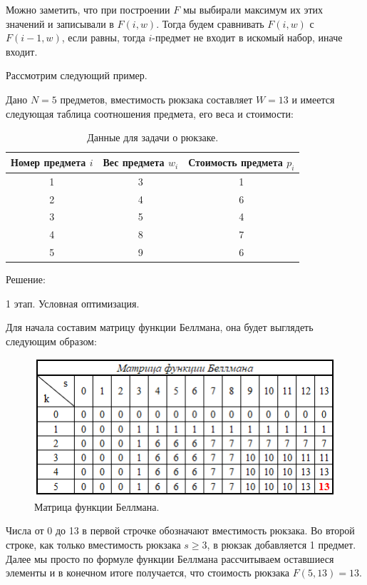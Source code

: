Можно заметить, что при построении $F$ мы выбирали максимум их этих значений и записывали в $F(i,w)$. Тогда будем сравнивать $F(i,w)$ с $F(i-1,w)$, если равны, тогда $i$-предмет не входит в искомый набор, иначе входит.

Рассмотрим следующий пример. 

Дано $N=5$ предметов, вместимость рюкзака составляет $W=13$ и имеется следующая таблица соотношения предмета, его веса и стоимости:

\begin{table}[h]
    \centering
    \begin{tabular}{|c|c|c|}
            \hline
            Номер предмета $i$ & Вес предмета $w_i$ & Стоимость предмета $p_i$\\
            \hline
            1 & 3 & 1\\
            \hline
            2 & 4 & 6\\
            \hline
            3 & 5 & 4\\
            \hline
            4 & 8 & 7\\
            \hline
            5 & 9 & 6\\
            \hline
    \end{tabular}
    \caption{Данные для задачи о рюкзаке.}
\end{table}

Решение: 

1 этап. Условная оптимизация. 

Для начала составим матрицу функции Беллмана, она будет выглядеть следующим образом:

\begin{figure}[h]
  \centering \includegraphics[scale=1]{content/images/bellman_knapsack.png}
  \caption{Матрица функции Беллмана.}
  \label{fig:bellman_knapsack}
\end{figure}

Числа от 0 до 13 в первой строчке обозначают вместимость рюкзака. Во второй строке, как только вместимость рюкзака $s\geq3$, в рюкзак добавляется 1 предмет. Далее мы просто по формуле функции Беллмана рассчитываем оставшиеся элементы и в конечном итоге получается, что стоимость рюкзака $F(5,13)=13$.

